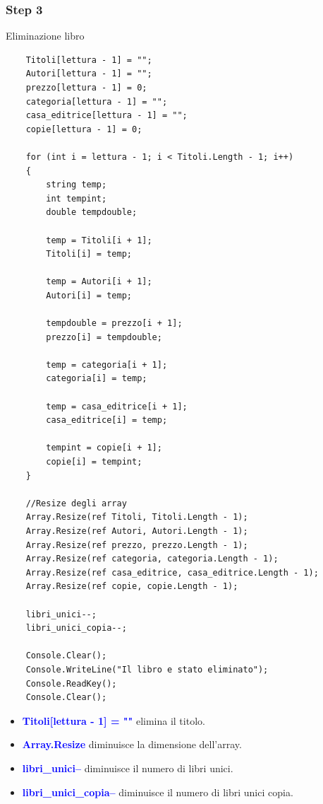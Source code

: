\documentclass[a4paper,12pt]{article}
\begin{document}
\newpage

\subsubsection{Step 3}

Eliminazione libro
\begin{lstlisting}
    Titoli[lettura - 1] = "";
    Autori[lettura - 1] = "";
    prezzo[lettura - 1] = 0;
    categoria[lettura - 1] = "";
    casa_editrice[lettura - 1] = "";
    copie[lettura - 1] = 0;

    for (int i = lettura - 1; i < Titoli.Length - 1; i++)
    {
        string temp;
        int tempint;
        double tempdouble;

        temp = Titoli[i + 1];
        Titoli[i] = temp;

        temp = Autori[i + 1];
        Autori[i] = temp;

        tempdouble = prezzo[i + 1];
        prezzo[i] = tempdouble;

        temp = categoria[i + 1];
        categoria[i] = temp;

        temp = casa_editrice[i + 1];
        casa_editrice[i] = temp;

        tempint = copie[i + 1];
        copie[i] = tempint;
    }

    //Resize degli array
    Array.Resize(ref Titoli, Titoli.Length - 1);
    Array.Resize(ref Autori, Autori.Length - 1);
    Array.Resize(ref prezzo, prezzo.Length - 1);
    Array.Resize(ref categoria, categoria.Length - 1);
    Array.Resize(ref casa_editrice, casa_editrice.Length - 1);
    Array.Resize(ref copie, copie.Length - 1);

    libri_unici--;
    libri_unici_copia--;

    Console.Clear();
    Console.WriteLine("Il libro e stato eliminato");
    Console.ReadKey();
    Console.Clear();
\end{lstlisting}

\begin{itemize}
    \item \textcolor{blue}{\textbf{Titoli[lettura - 1] = ""}} elimina il titolo.
    \item \textcolor{blue}{\textbf{Array.Resize}} diminuisce la dimensione dell'array.
    \item \textcolor{blue}{\textbf{libri\_unici--}} diminuisce il numero di libri unici.
    \item \textcolor{blue}{\textbf{libri\_unici\_copia--}} diminuisce il numero di libri unici copia.
\end{itemize}
\end{document}

